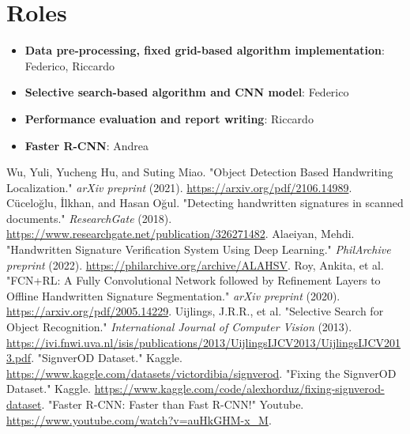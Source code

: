 \documentclass[a4paper,12pt]{article}
\begin{document}
\section{Roles}
\begin{itemize}
    \item \textbf{Data pre-processing, fixed grid-based algorithm implementation}: Federico, Riccardo
    \item \textbf{Selective search-based algorithm and CNN model}: Federico
    \item \textbf{Performance evaluation and report writing}: Riccardo
    \item \textbf{Faster R-CNN}: Andrea
\end{itemize}

\begin{thebibliography}{9}
 Wu, Yuli, Yucheng Hu, and Suting Miao. "Object Detection Based Handwriting Localization." \textit{arXiv preprint} (2021). \url{https://arxiv.org/pdf/2106.14989}.
 Cüceloğlu, İlkhan, and Hasan Oğul. "Detecting handwritten signatures in scanned documents." \textit{ResearchGate} (2018). \url{https://www.researchgate.net/publication/326271482}.
 Alaeiyan, Mehdi. "Handwritten Signature Verification System Using Deep Learning." \textit{PhilArchive preprint} (2022). \url{https://philarchive.org/archive/ALAHSV}.
 Roy, Ankita, et al. "FCN+RL: A Fully Convolutional Network followed by Refinement Layers to Offline Handwritten Signature Segmentation." \textit{arXiv preprint} (2020). \url{https://arxiv.org/pdf/2005.14229}.
 Uijlings, J.R.R., et al. "Selective Search for Object Recognition." \textit{International Journal of Computer Vision} (2013). \url{https://ivi.fnwi.uva.nl/isis/publications/2013/UijlingsIJCV2013/UijlingsIJCV2013.pdf}.
 "SignverOD Dataset." Kaggle. \url{https://www.kaggle.com/datasets/victordibia/signverod}.
 "Fixing the SignverOD Dataset." Kaggle. \url{https://www.kaggle.com/code/alexhorduz/fixing-signverod-dataset}.
 "Faster R-CNN: Faster than Fast R-CNN!" Youtube.  \url{https://www.youtube.com/watch?v=auHkGHM-x_M}.
\end{thebibliography}
\end{document}
